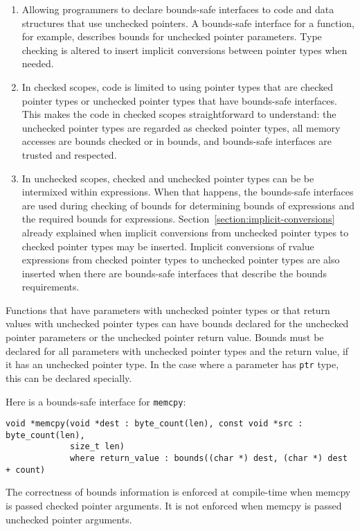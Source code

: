 \begin{enumerate}
\item
  Allowing programmers to declare bounds-safe interfaces to code and
  data structures that use unchecked pointers. A bounds-safe interface for
  a function, for example, describes bounds for unchecked pointer
  parameters.   Type checking is altered to insert implicit conversions
  between pointer types when needed.
\item
  In checked scopes, code is limited to using pointer types that are 
  checked pointer types or unchecked pointer types that have bounds-safe interfaces.
  This makes the code in checked scopes straightforward to understand:
  the unchecked pointer types are regarded as checked pointer types, all memory
  accesses are bounds checked or in bounds, and bounds-safe interfaces are trusted
  and respected.
\item
  In unchecked scopes, checked and unchecked pointer types can be
  be intermixed within expressions.  When that happens, the bounds-safe
  interfaces are used during checking of bounds for determining bounds
  of expressions and the required bounds for expressions. 
  Section~\ref{section:implicit-conversions} already
  explained when implicit conversions from unchecked pointer types to checked pointer
  types may be inserted.   Implicit conversions of rvalue expressions 
  from checked pointer types to unchecked pointer types are also inserted when
  there are bounds-safe interfaces that describe the bounds requirements.
\end{enumerate}

Functions that have parameters with unchecked pointer types or that return
values with unchecked pointer types can have bounds declared for the unchecked
pointer parameters or the unchecked pointer return value. Bounds must be
declared for all parameters with unchecked pointer types and the return
value, if it has an unchecked pointer type. In the case where a parameter
has \texttt{ptr} type, this can be declared specially.

Here is a bounds-safe interface for \texttt{memcpy}:
\begin{verbatim}
void *memcpy(void *dest : byte_count(len), const void *src : byte_count(len), 
             size_t len) 
             where return_value : bounds((char *) dest, (char *) dest + count)
\end{verbatim}

The correctness of bounds information is enforced at compile-time when
memcpy is passed checked pointer arguments. It is not enforced when memcpy
is passed unchecked pointer arguments.


